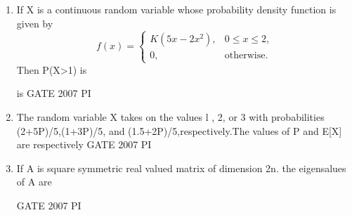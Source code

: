 \documentclass[journal,12pt,onecolumn]{IEEEtran}
\theoremstyle{remark}
\begin{document}
\begin{enumerate}
\item
If X is a continuous random variable whose probability density function is given by
       \[
f(x) =
\begin{cases}
K(5x - 2x^2), & 0 \leq x \leq 2, \\
0, & \text{otherwise}.
\end{cases}
\]
 Then P(X>1) is
        
        
        
            is
            \hfill{GATE 2007 PI}
            \begin{enumerate}
            \end{enumerate}
            
            \item 
            The random variable X takes on the values l , 2, or 3 with probabilities (2+5P)/5,(1+3P)/5, and (1.5+2P)/5,respectively.The values of P and E[X] are respectively
\hfill{GATE 2007 PI}

            \begin{enumerate}
            \end{enumerate}
            
            \item
           	If A is square symmetric real valued matrix of dimension 2n. the eigensalues of A are


            \hfill{GATE 2007 PI}
            \begin{enumerate}
            \end{enumerate}
        

\end{enumerate}
\end{document}
